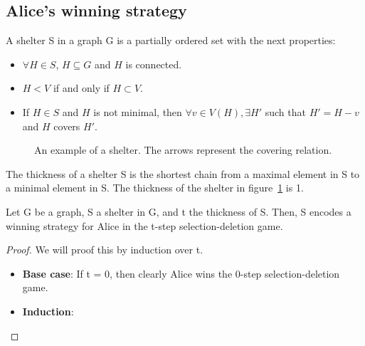 \subsection{Alice's winning strategy}
\begin{definition}
A shelter S in a graph G is a partially ordered set with the next properties:
\begin{itemize}
  \item $\forall H \in S$, $H \subseteq G$ and $H$ is connected.
  \item $H < V$ if and only if $H \subset V$.
  \item If $H \in S$ and $H$ is not minimal, then $\forall v \in V(H), \exists H'$ such that $H' = H - v$ and $H$ covers $H'$.
\end{itemize}
\end{definition}

\begin{figure}[H]

\caption{An example of a shelter. The arrows represent the covering relation. \label{fig:shelter-example}}
\end{figure}
The thickness of a shelter S is the shortest chain from a maximal element in S to a minimal element in S. The thickness of the shelter in figure~\ref{fig:shelter-example} is 1.
\begin{lemma}
Let G be a graph, S a shelter in G, and t the thickness of S. Then, S encodes a winning strategy for Alice in the t-step selection-deletion game.
\end{lemma}
\begin{proof}
We will proof this by induction over t.
\begin{itemize}
  \item \textbf{Base case}: If t = 0, then clearly Alice wins the 0-step selection-deletion game.
  \item \textbf{Induction}: 
\end{itemize}
\end{proof}